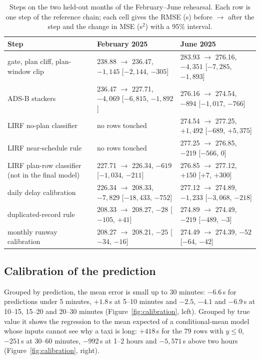 \documentclass[
  manuscript=article,
  layout=preprint,
  year=2026,
  volume=x,
]{extra/joas}
\begin{document}
\begin{table}[htbp!]
  \centering
  \footnotesize
  \caption{Steps on the two held-out months of the February--June rehearsal. Each row is one step of the reference chain; each cell gives the RMSE (s) before $\to$ after the step and the change in MSE (s$^2$) with a 95\% interval.}
  \label{tb:rehearsal}
  \begin{tabular}{L{0.27\textwidth}L{0.31\textwidth}L{0.31\textwidth}}
  \toprule
  \textbf{Step} & \textbf{February 2025} & \textbf{June 2025} \\
  \midrule
  gate, plan cliff, plan-window clip & 238.88 $\to$ 236.47, $-1{,}145$ [$-2{,}144$, $-305$] & 283.93 $\to$ 276.16, $-4{,}351$ [$-7{,}285$, $-1{,}893$] \\
  ADS-B stackers & 236.47 $\to$ 227.71, $-4{,}069$ [$-6{,}815$, $-1{,}892$] & 276.16 $\to$ 274.54, $-894$ [$-1{,}017$, $-766$] \\
  LIRF no-plan classifier & no rows touched & 274.54 $\to$ 277.25, $+1{,}492$ [$-689$, $+5{,}375$] \\
  LIRF near-schedule rule & no rows touched & 277.25 $\to$ 276.85, $-219$ [$-566$, $0$] \\
  LIRF plan-row classifier (not in the final model) & 227.71 $\to$ 226.34, $-619$ [$-1{,}034$, $-211$] & 276.85 $\to$ 277.12, $+150$ [$+7$, $+300$] \\
  daily delay calibration & 226.34 $\to$ 208.33, $-7{,}829$ [$-18{,}433$, $-752$] & 277.12 $\to$ 274.89, $-1{,}233$ [$-3{,}068$, $-218$] \\
  duplicated-record rule & 208.33 $\to$ 208.27, $-28$ [$-105$, $+41$] & 274.89 $\to$ 274.49, $-219$ [$-489$, $-3$] \\
  monthly runway calibration & 208.27 $\to$ 208.21, $-25$ [$-34$, $-16$] & 274.49 $\to$ 274.39, $-52$ [$-64$, $-42$] \\
  \bottomrule
  \end{tabular}
\end{table}

\subsection{Calibration of the prediction}

Grouped by prediction, the mean error is small up to 30 minutes: $-6.6$\,s for predictions under 5 minutes, $+1.8$\,s at 5--10 minutes
and $-2.5$, $-4.1$ and $-6.9$\,s at 10--15, 15--20 and 20--30 minutes (Figure~\ref{fig:calibration}, left). Grouped by true value it shows
the regression to the mean expected of a conditional-mean model whose inputs cannot see why a taxi is long: $+418$\,s for the 79 rows with
$y \le 0$, $-251$\,s at 30--60 minutes, $-992$\,s at 1--2 hours and $-5{,}571$\,s above two hours (Figure~\ref{fig:calibration}, right).
\end{document}
